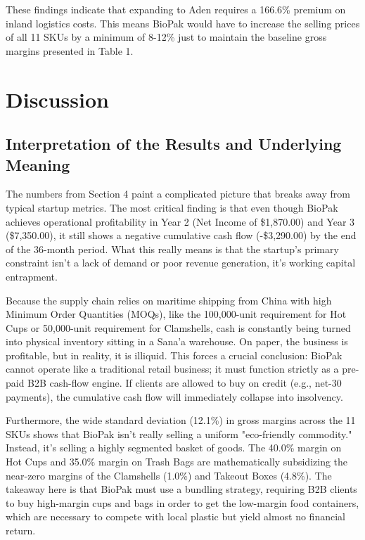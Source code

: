 \documentclass[12pt,a4paper]{article}
\begin{document}
These findings indicate that expanding to Aden requires a 166.6\% premium on inland logistics costs. This means BioPak would have to increase the selling prices of all 11 SKUs by a minimum of 8-12\% just to maintain the baseline gross margins presented in Table 1.

\section{Discussion}

\subsection{Interpretation of the Results and Underlying Meaning}

The numbers from Section 4 paint a complicated picture that breaks away from typical startup metrics. The most critical finding is that even though BioPak achieves operational profitability in Year 2 (Net Income of \$1,870.00) and Year 3 (\$7,350.00), it still shows a negative cumulative cash flow (-\$3,290.00) by the end of the 36-month period. What this really means is that the startup's primary constraint isn't a lack of demand or poor revenue generation, it's working capital entrapment.

Because the supply chain relies on maritime shipping from China with high Minimum Order Quantities (MOQs), like the 100,000-unit requirement for Hot Cups or 50,000-unit requirement for Clamshells, cash is constantly being turned into physical inventory sitting in a Sana'a warehouse. On paper, the business is profitable, but in reality, it is illiquid. This forces a crucial conclusion: BioPak cannot operate like a traditional retail business; it must function strictly as a pre-paid B2B cash-flow engine. If clients are allowed to buy on credit (e.g., net-30 payments), the cumulative cash flow will immediately collapse into insolvency.

Furthermore, the wide standard deviation (12.1\%) in gross margins across the 11 SKUs shows that BioPak isn't really selling a uniform "eco-friendly commodity." Instead, it's selling a highly segmented basket of goods. The 40.0\% margin on Hot Cups and 35.0\% margin on Trash Bags are mathematically subsidizing the near-zero margins of the Clamshells (1.0\%) and Takeout Boxes (4.8\%). The takeaway here is that BioPak must use a bundling strategy, requiring B2B clients to buy high-margin cups and bags in order to get the low-margin food containers, which are necessary to compete with local plastic but yield almost no financial return.
\end{document}
